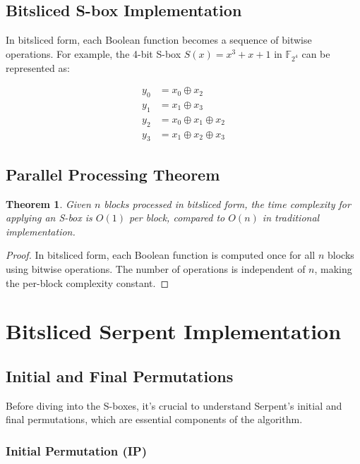 \documentclass[11pt,a4paper]{article}
\newtheorem{theorem}{Theorem}[section]
\begin{document}
\subsection{Bitsliced S-box Implementation}

In bitsliced form, each Boolean function becomes a sequence of bitwise operations. For example, the 4-bit S-box $S(x) = x^3 + x + 1$ in $\mathbb{F}_{2^4}$ can be represented as:

\begin{align}
y_0 &= x_0 \oplus x_2 \\
y_1 &= x_1 \oplus x_3 \\
y_2 &= x_0 \oplus x_1 \oplus x_2 \\
y_3 &= x_1 \oplus x_2 \oplus x_3
\end{align}

\subsection{Parallel Processing Theorem}

\begin{theorem}
Given $n$ blocks processed in bitsliced form, the time complexity for applying an S-box is $O(1)$ per block, compared to $O(n)$ in traditional implementation.
\end{theorem}

\begin{proof}
In bitsliced form, each Boolean function is computed once for all $n$ blocks using bitwise operations. The number of operations is independent of $n$, making the per-block complexity constant.
\end{proof}

\section{Bitsliced Serpent Implementation}

\subsection{Initial and Final Permutations}

Before diving into the S-boxes, it's crucial to understand Serpent's initial and final permutations, which are essential components of the algorithm.

\subsubsection{Initial Permutation (IP)}
\end{document}

